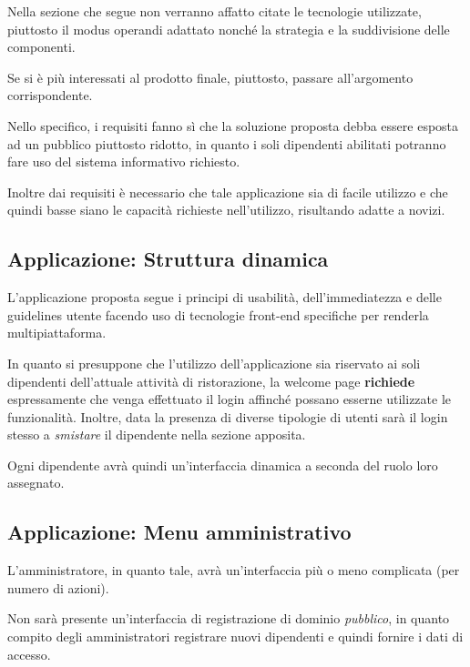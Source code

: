 \begin{chapterbox}[Disambiguazione]
	Nella sezione che segue non verranno affatto citate le tecnologie utilizzate, piuttosto il modus operandi adattato nonché la strategia e la suddivisione delle componenti.
	
	\vspace{0.25cm}
	Se si è più interessati al prodotto finale, piuttosto, passare all'argomento corrispondente.
\end{chapterbox}

Nello specifico, i requisiti fanno sì che la soluzione proposta debba essere esposta ad un pubblico piuttosto ridotto, in quanto i soli dipendenti abilitati potranno fare uso del sistema informativo richiesto.

Inoltre dai requisiti è necessario che tale applicazione sia di facile utilizzo e che quindi basse siano le capacità richieste nell'utilizzo, risultando adatte a novizi.

\subsection{Applicazione: Struttura dinamica}
L'applicazione proposta segue i principi di usabilità, dell'immediatezza e delle guidelines utente facendo uso di tecnologie front-end specifiche per renderla multipiattaforma.

In quanto si presuppone che l'utilizzo dell'applicazione sia riservato ai soli dipendenti dell'attuale attività di ristorazione, la welcome page \textbf{richiede} espressamente che venga effettuato il login affinché possano esserne utilizzate le funzionalità. Inoltre, data la presenza di diverse tipologie di utenti  sarà il login stesso a \textit{smistare} il dipendente nella sezione apposita.

Ogni dipendente avrà quindi un'interfaccia dinamica a seconda del ruolo loro assegnato.

\subsection{Applicazione: Menu amministrativo}
L'amministratore, in quanto tale, avrà un'interfaccia più o meno complicata (per numero di azioni).

Non sarà presente un'interfaccia di registrazione di dominio \textit{pubblico}, in quanto compito degli amministratori registrare nuovi dipendenti e quindi fornire i dati di accesso.

